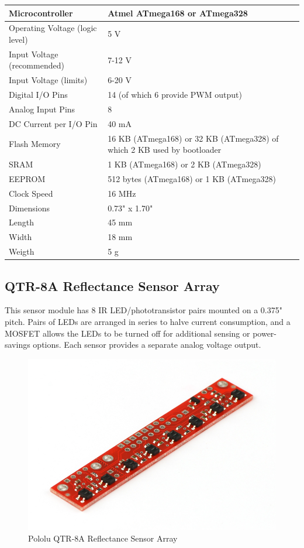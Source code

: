 \documentclass[14pt,a4paper]{extarticle}
\begin{document}
	\begin{tabular}{| p{5cm} | p{12cm} |}

	\hline
	Microcontroller & Atmel ATmega168 or ATmega328 \\ \hline
	Operating Voltage (logic level) & 5 V \\ \hline
	Input Voltage (recommended) &	7-12 V \\ \hline
	Input Voltage (limits)	& 6-20 V \\ \hline
Digital I/O Pins &	14 (of which 6 provide PWM output)\\ \hline
Analog Input Pins &	8 \\ \hline
DC Current per I/O Pin & 40 mA \\ \hline
Flash Memory &	16 KB (ATmega168) or 32 KB (ATmega328) of which 2 KB used by bootloader \\ \hline
SRAM &	1 KB (ATmega168) or 2 KB (ATmega328)\\ \hline
EEPROM	& 512 bytes (ATmega168) or 1 KB (ATmega328)\\ \hline
Clock Speed &	16 MHz \\ \hline
Dimensions &	0.73" x 1.70" \\ \hline
Length &	45 mm\\ \hline
Width &	18 mm\\ \hline
Weigth	& 5 g\\ \hline
	
	\end{tabular}

	
	\subsection{QTR-8A Reflectance Sensor Array}
	
	This sensor module has 8 IR LED/phototransistor pairs mounted on a 0.375" pitch. Pairs of LEDs are arranged in series to halve current consumption, and a MOSFET allows the LEDs to be turned off for additional sensing or power-savings options. Each sensor provides a separate analog voltage output.
	
	\begin{figure}[H]
		\includegraphics[scale=.28, center]{qtr.jpg}
		\caption{Pololu QTR-8A Reflectance Sensor Array}
	\end{figure}
	
\end{document}
